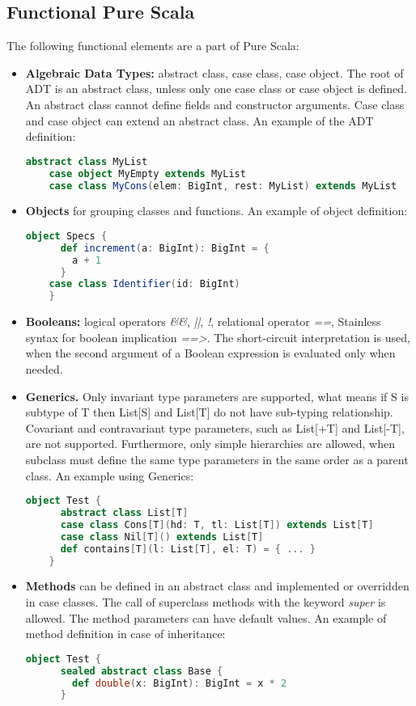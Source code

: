 \subsection{Functional Pure Scala}
The following functional elements are a part of Pure Scala:
\begin{itemize}
  \item \textbf{Algebraic Data Types:} abstract class, case class, case object. 
  The root of ADT is an abstract class, unless only one case class or case object is defined.
  An abstract class cannot define fields and constructor arguments. 
  Case class and case object can extend an abstract class.
  An example of the ADT definition:
  \begin{lstlisting}[language=Scala]
    abstract class MyList
    case object MyEmpty extends MyList
    case class MyCons(elem: BigInt, rest: MyList) extends MyList
  \end{lstlisting}
  \item \textbf{Objects} for grouping classes and functions.
  An example of object definition:
  \begin{lstlisting}[language=Scala]
    object Specs {
      def increment(a: BigInt): BigInt = {
        a + 1
      }
    case class Identifier(id: BigInt)
    }
  \end{lstlisting}
  \item \textbf{Booleans:} logical operators  \textit{\&\&}, \textit{||}, \textit{!}, relational operator \textit{==}, Stainless syntax for boolean implication \textit{==>}. 
  The short-circuit interpretation is used, when the second argument of a Boolean expression is evaluated only when needed.
  \item \textbf{Generics.} Only invariant type parameters are supported, what means if S is subtype of T then List[S] and List[T] do not have sub-typing relationship.
  Covariant and contravariant type parameters, such as List[+T] and List[-T], are not supported. 
  Furthermore, only simple hierarchies are allowed, when subclass must define the same type parameters in the same order as a parent class.
  An example using Generics:
  \begin{lstlisting}[language=Scala]
    object Test {
      abstract class List[T]
      case class Cons[T](hd: T, tl: List[T]) extends List[T]
      case class Nil[T]() extends List[T]
      def contains[T](l: List[T], el: T) = { ... }
    }
  \end{lstlisting}
  \item \textbf{Methods} can be defined in an abstract class and implemented or overridden in case classes. 
  The call of superclass methods with the keyword \textit{super} is allowed. 
  The method parameters can have default values. 
  An example of method definition in case of inheritance:
  \begin{lstlisting}[language=Scala]
    object Test {
      sealed abstract class Base {
        def double(x: BigInt): BigInt = x * 2
      }


\end{lstlisting}
\end{itemize}

